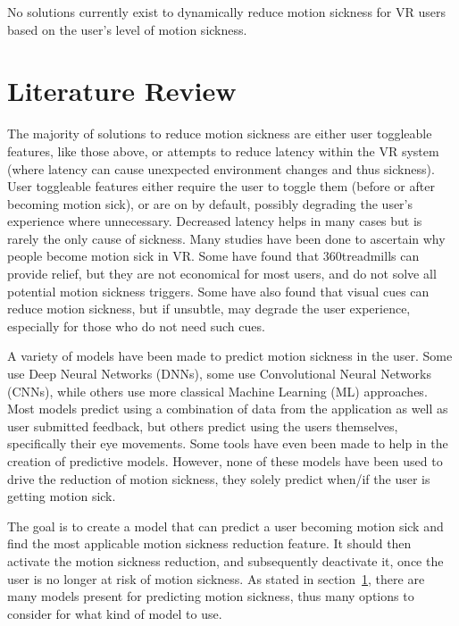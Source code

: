 No solutions currently exist to dynamically reduce motion sickness for VR users based on the user's level of motion sickness.

\section{Literature Review}
\label{sec:lit_review}

The majority of solutions to reduce motion sickness are either user toggleable features, like those above, or attempts to reduce latency within the VR system\cite{kundu2021study} (where latency can cause unexpected environment changes and thus sickness).
User toggleable features either require the user to toggle them (before or after becoming motion sick), or are on by default, possibly degrading the user's experience where unnecessary.
Decreased latency helps in many cases but is rarely the only cause of sickness.
Many studies have been done to ascertain why people become motion sick in VR\cite{9236907,9133071}.
Some have found that 360\textdegree treadmills can provide relief\cite{10.1117/12.2626662}, but they are not economical for most users, and do not solve all potential motion sickness triggers.
Some have also found that visual cues can reduce motion sickness\cite{10.1145/3544999.3552489}, but if unsubtle, may degrade the user experience, especially for those who do not need such cues.

A variety of models have been made to predict motion sickness in the user.
Some use Deep Neural Networks (DNNs)\cite{8613651}, some use Convolutional Neural Networks (CNNs)\cite{8642906}, while others use more classical Machine Learning (ML) approaches\cite{8267239}.
Most models predict using a combination of data from the application as well as user submitted feedback, but others predict using the users themselves, specifically their eye movements\cite{9234030,https://doi.org/10.1111/cgf.14703}.
Some tools have even been made to help in the creation of predictive models\cite{10.1145/3526113.3545656}.
However, none of these models have been used to drive the reduction of motion sickness, they solely predict when/if the user is getting motion sick.

\label{sec:objectives}

The goal is to create a model that can predict a user becoming motion sick and find the most applicable motion sickness reduction feature.
It should then activate the motion sickness reduction, and subsequently deactivate it, once the user is no longer at risk of motion sickness.
As stated in section~\ref{sec:lit_review}, there are many models present for predicting motion sickness, thus many options to consider for what kind of model to use.

